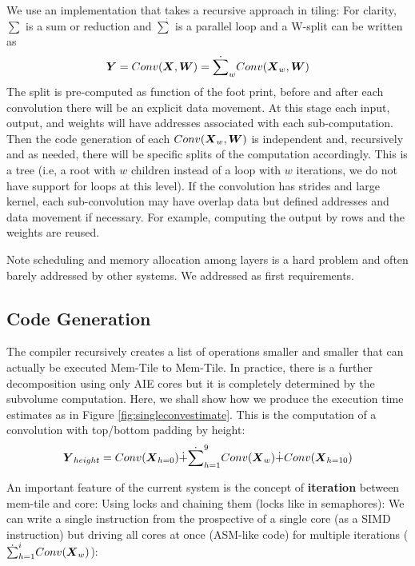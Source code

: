 \documentclass[sigconf]{acmart}
\begin{document}
We use an implementation that takes a recursive approach in tiling: %
For clarity, $\sum$ is a sum or reduction and
$\dot{\sum}$ is a parallel loop and a W-split can be written as
\begin{equation}
  {\boldsymbol Y} =  Conv({\boldsymbol X},{\boldsymbol W}) = \dot{\sum}_w
  Conv({\boldsymbol X}_w,{\boldsymbol W})
\end{equation}
The split is pre-computed as function of the foot print, before and
after each convolution there will be an explicit data movement. At
this stage each input, output, and weights will have addresses
associated with each sub-computation. Then the code generation of each
$Conv({\boldsymbol X}_w,{\boldsymbol W})$ is independent and, recursively and as needed,
there will be specific splits of the computation accordingly. This is
a tree (i.e, a root with $w$ children instead of a loop with $w$
iterations, we do not have support for loops at this level). If the
convolution has strides and large kernel, each sub-convolution may
have overlap data but defined addresses and data movement if
necessary. For example, computing the output by rows and the weights
are reused.

Note scheduling and memory allocation among layers is a hard problem
and often barely addressed by other systems. We addressed as first
requirements.

\subsection{Code Generation }
The compiler recursively creates a list of operations smaller and
smaller that can actually be executed Mem-Tile to Mem-Tile. In
practice, there is a further decomposition using only AIE cores but it
is completely determined by the subvolume computation. Here, we shall
show how we produce the execution time estimates as in Figure
\ref{fig:singleconvestimate}.  This is the computation of a
convolution with top/bottom padding by height:
\begin{equation}
  {\boldsymbol Y}_{height} =   Conv({\boldsymbol X}_{h=0}) \dot{+} \dot{\sum}_{h=1}^9
  Conv({\boldsymbol X}_w) \dot{+} Conv({\boldsymbol X}_{h=10})
\end{equation}

An important feature of the current system is the concept of {\bf
  iteration} between mem-tile and core: Using locks and chaining them
(locks like in semaphores): We can write a single instruction from the
prospective of a single core (as a SIMD instruction) but driving all
cores at once (ASM-like code) for multiple iterations ($\dot{\sum}_{h=1}^i
Conv({\boldsymbol X}_w)$):
\end{document}
